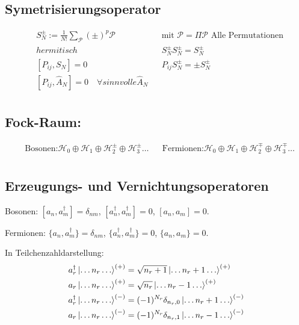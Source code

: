 \documentclass[10pt,a4paper,notitlepage]{scrartcl}
\begin{document}
\subsection*{Symetrisierungsoperator}
\begin{align*}
    & S_N^\pm := \frac{1}{N!}\sum_\mathcal{P}(\pm)^p \mathcal{P} && \text{mit } \mathcal{P} =
    \Pi \mathcal{P} \text{ Alle Permutationen}\\
    & hermitisch && S_N^{\pm}S_N^{\pm}=S_N^{\pm}\\
    & [P_{ij}, S_N] = 0 && P_{ij}S_N^{\pm} = \pm S_N^{\pm} \\
    & [P_{ij},\hat A_N]=0 \quad \forall sinnvolle \hat A_N\\
\end{align*}

\subsection*{Fock-Raum:}
\begin{align*}
   &\text{Bosonen:} \mathcal{H}_0 \oplus \mathcal{H}_1 \oplus \mathcal{H}_2^\pm \oplus \mathcal{H}_3^\pm\ldots
   && \text{Fermionen:} \mathcal{H}_0 \oplus \mathcal{H}_1 \oplus \mathcal{H}_2^\mp \oplus \mathcal{H}_3^\mp\ldots\\
\end{align*}

\subsection*{Erzeugungs- und Vernichtungsoperatoren}

Bosonen: $[a_n, a_m^\dagger] = \delta_{n m}$, $[a_n^\dagger, a_m^\dagger] = 0$, $[a_n, a_m] = 0$.

Fermionen: $\{a_n, a_m^\dagger\} = \delta_{n m}$, $\{a_n^\dagger, a_m^\dagger\} = 0$, $\{a_n, a_m\} = 0$.

In Teilchenzahldarstellung: 
\begin{align*}
    a_r^\dagger \ket{\ldots n_r \ldots}^{(+)} &= \sqrt{n_r + 1} \ket{\ldots n_r+1 \ldots}^{(+)} \\
    a_r \ket{\ldots n_r \ldots}^{(+)} &= \sqrt{n_r} \ket{\ldots n_r-1 \ldots}^{(+)} \\
    a_r^\dagger \ket{\ldots n_r \ldots}^{(-)} &= (-1)^{N_r} \delta_{n_r, 0} \ket{\ldots n_r+1 \ldots}^{(-)} \\
    a_r \ket{\ldots n_r \ldots}^{(-)} &= (-1)^{N_r} \delta_{n_r, 1}  \ket{\ldots n_r-1 \ldots}^{(-)}
\end{align*}
\end{document}

